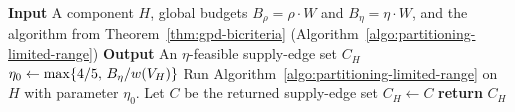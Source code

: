 \begin{algorithm}[H]
    \caption{Recursive extension to the full parameter range}\label{alg:recursive-partitioning}
    \textbf{Input} A component $H$, global budgets $B_\rho=\rho\cdot W$ and $B_\eta=\eta\cdot W$, and the algorithm from Theorem~\ref{thm:gpd-bicriteria} (Algorithm~\ref{algo:partitioning-limited-range})\;
    \textbf{Output} An $\eta$-feasible supply-edge set $C_H$\;
    $\eta_0\gets\max\mathopen{}\left\{ 4/5,\,B_\eta/w\mathopen{}\left( V_H \right) \right\}$\;
    Run Algorithm~\ref{algo:partitioning-limited-range} on $H$ with parameter $\eta_0$. Let $C$ be the returned supply-edge set\;
    $C_H\gets C$\;
    \textbf{return} $C_H$\;
\end{algorithm}
